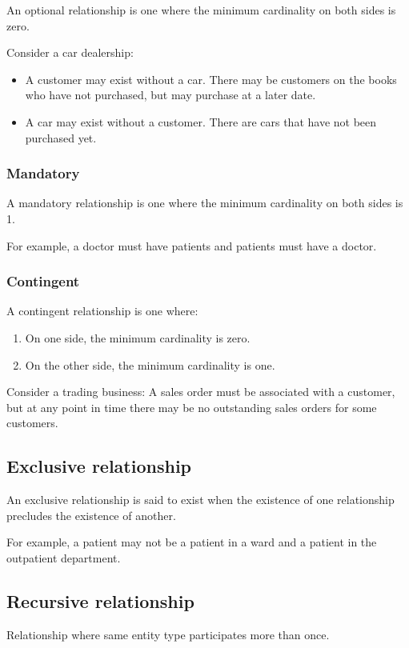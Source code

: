 \documentclass[slides]{pgnotes}
\begin{document}
An optional relationship is one where the minimum cardinality on both
sides is zero.

Consider a car dealership:

\begin{itemize}
\item
  A customer may exist without a car. There may be customers on the
  books who have not purchased, but may purchase at a later date.
\item
  A car may exist without a customer. There are cars that have not been
  purchased yet.
\end{itemize}

\subsubsection{Mandatory}
\label{mandatory}

A mandatory relationship is one where the minimum cardinality on both sides is 1.

For example, a doctor must have patients and patients must have a doctor.

\subsubsection{Contingent}
\label{contingent}

A contingent relationship is one where:

\begin{enumerate}
\def\labelenumi{\arabic{enumi}.}
\item
  On one side, the minimum cardinality is zero.
\item
  On the other side, the minimum cardinality is one.
\end{enumerate}

Consider a trading business: A sales order must be associated with a
customer, but at any point in time there may be no outstanding sales
orders for some customers.

\subsection{Exclusive relationship}
\label{exclusive-relationship}

An exclusive relationship is said to exist when the existence of one
relationship precludes the existence of another.

For example, a patient may not be a patient in a ward and a patient in
the outpatient department.



\subsection{Recursive relationship}\label{recursive-relationship}

Relationship where same entity type participates more than once.
\end{document}

